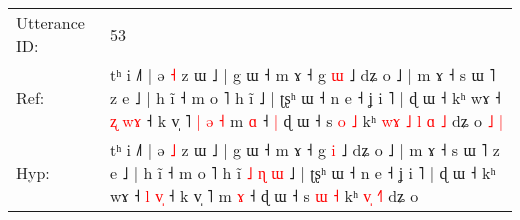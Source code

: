 \documentclass[10pt]{article}
\DeclareRobustCommand{\hl}[1]{{\textcolor{red}{#1}}}
\begin{document}
\begin{longtable}{ll}
 \\
\midrule
Utterance ID: & 53 \\
Ref: & tʰ i ˩˥ | ə \hl{˧} z ɯ ˩ | g ɯ ˧ m ɤ ˧ g \hl{ɯ} ˩ dʑ o ˩ | m ɤ ˧ s ɯ ˥ z e ˩ | h ĩ ˧ m o ˥ h ĩ\hl{}\hl{}\hl{}\hl{}\hl{}\hl{} ˩ | ʈʂʰ ɯ ˧ n e ˧ ʝ i ˥ | ɖ ɯ ˧ kʰ wɤ ˧ \hl{ʐ} \hl{w}\hl{ɤ} ˧ k v̩ ˥\hl{ }\hl{|}\hl{ }\hl{ə}\hl{ }\hl{˧} m \hl{ɑ} ˧\hl{ }\hl{|} ɖ ɯ ˧ s \hl{o} \hl{˩} kʰ\hl{ }\hl{w}\hl{ɤ} \hl{˩}\hl{ }\hl{l} \hl{ɑ}\hl{ }\hl{˩} dʑ o\hl{ }\hl{˩}\hl{ }\hl{|}
 \\
Hyp: & tʰ i ˩˥ | ə \hl{˩} z ɯ ˩ | g ɯ ˧ m ɤ ˧ g \hl{i} ˩ dʑ o ˩ | m ɤ ˧ s ɯ ˥ z e ˩ | h ĩ ˧ m o ˥ h ĩ\hl{ }\hl{˩}\hl{ }\hl{ɳ}\hl{ }\hl{ɯ} ˩ | ʈʂʰ ɯ ˧ n e ˧ ʝ i ˥ | ɖ ɯ ˧ kʰ wɤ ˧ \hl{l} \hl{v}\hl{̩} ˧ k v̩ ˥\hl{}\hl{}\hl{}\hl{}\hl{}\hl{} m \hl{ɤ} ˧\hl{}\hl{} ɖ ɯ ˧ s \hl{ɯ} \hl{˧} kʰ\hl{}\hl{}\hl{} \hl{}\hl{v}\hl{̩} \hl{}\hl{˧}\hl{˥} dʑ o\hl{}\hl{}\hl{}\hl{}
 \\
\midrule
\end{longtable}
\end{document}
